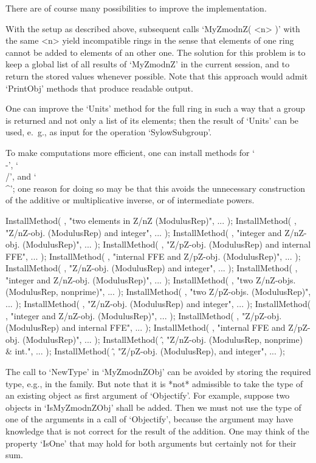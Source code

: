 
There are of course many possibilities to improve the implementation.

With the setup as described above,
subsequent calls `MyZmodnZ( <n> )' with the same <n> yield incompatible
rings in the sense that elements of one ring cannot be added to elements
of an other one.
The solution for this problem is to keep a global list of all results of
`MyZmodnZ' in the current {\GAP} session, and to return the stored values
whenever possible.
Note that this approach would admit `PrintObj' methods that produce
{\GAP} readable output.

One can improve the `Units' method for the full ring in such a way
that a group is returned and not only a list of its elements;
then the result of `Units' can be used, e.~g., as input for the operation
`SylowSubgroup'.

To make computations more efficient,
one can install methods for `\\-', `\\/', and `\\^';
one reason for doing so may be that this avoids the unnecessary construction
of the additive or multiplicative inverse, or of intermediate powers.

\begintt
InstallMethod( \-, "two elements in Z/nZ (ModulusRep)", ... );
InstallMethod( \-, "Z/nZ-obj. (ModulusRep) and integer", ... );
InstallMethod( \-, "integer and Z/nZ-obj. (ModulusRep)", ... );
InstallMethod( \-, "Z/pZ-obj. (ModulusRep) and internal FFE", ... );
InstallMethod( \-, "internal FFE and Z/pZ-obj. (ModulusRep)", ... );
InstallMethod( \*, "Z/nZ-obj. (ModulusRep) and integer", ... );
InstallMethod( \*, "integer and Z/nZ-obj. (ModulusRep)", ... );
InstallMethod( \/, "two Z/nZ-objs. (ModulusRep, nonprime)", ... );
InstallMethod( \/, "two Z/pZ-objs. (ModulusRep)", ... );
InstallMethod( \/, "Z/nZ-obj. (ModulusRep) and integer", ... );
InstallMethod( \/, "integer and Z/nZ-obj. (ModulusRep)", ... );
InstallMethod( \/, "Z/pZ-obj. (ModulusRep) and internal FFE", ... );
InstallMethod( \/, "internal FFE and Z/pZ-obj. (ModulusRep)", ... );
InstallMethod( \^, "Z/nZ-obj. (ModulusRep, nonprime) & int.", ... );
InstallMethod( \^, "Z/pZ-obj. (ModulusRep), and integer", ... );
\endtt

The call to `NewType' in `MyZmodnZObj' can be avoided by storing
the required type, e.g., in the family.
But note that it is *not* admissible to take the type of an existing
object as first argument of `Objectify'.
For example, suppose two objects in `IsMyZmodnZObj' shall be added.
Then we must not use the type of one of the arguments in a call of
`Objectify', because the argument may have knowledge that is not
correct for the result of the addition.
One may think of the property `IsOne' that may hold for both
arguments but certainly not for their sum.

